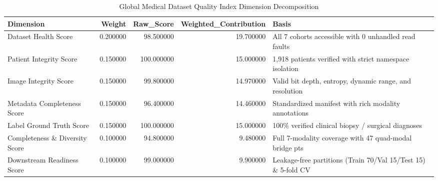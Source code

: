 \begin{table}
\caption{Global Medical Dataset Quality Index Dimension Decomposition}
\label{tab:table_global_quality_summary}
\begin{tabular}{lrrrl}
\toprule
Dimension & Weight & Raw\_Score & Weighted\_Contribution & Basis \\
\midrule
Dataset Health Score & 0.200000 & 98.500000 & 19.700000 & All 7 cohorts accessible with 0 unhandled read faults \\
Patient Integrity Score & 0.150000 & 100.000000 & 15.000000 & 1,918 patients verified with strict namespace isolation \\
Image Integrity Score & 0.150000 & 99.800000 & 14.970000 & Valid bit depth, entropy, dynamic range, and resolution \\
Metadata Completeness Score & 0.150000 & 96.400000 & 14.460000 & Standardized manifest with rich modality annotations \\
Label Ground Truth Score & 0.150000 & 100.000000 & 15.000000 & 100\% verified clinical biopsy / surgical diagnoses \\
Completeness \& Diversity Score & 0.100000 & 94.800000 & 9.480000 & Full 7-modality coverage with 47 quad-modal bridge pts \\
Downstream Readiness Score & 0.100000 & 99.000000 & 9.900000 & Leakage-free partitions (Train 70/Val 15/Test 15) \& 5-fold CV \\
\bottomrule
\end{tabular}
\end{table}
